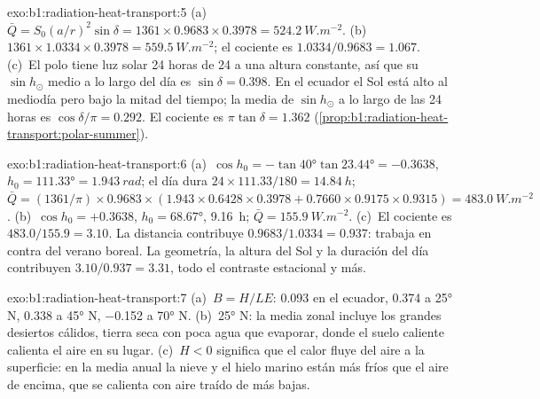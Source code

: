 \begin{solution}{exo:b1:radiation-heat-transport:5}
(a)~$\bar Q = S_0(a/r)^2\sin\delta = 1361 \times 0.9683 \times 0.3978 =
\qty{524.2}{W.m^{-2}}$. (b)~$1361 \times 1.0334 \times 0.3978 =
\qty{559.5}{W.m^{-2}}$; el cociente es $1.0334/0.9683 = 1.067$. (c)~El polo tiene
luz solar 24 horas de 24 a una altura constante, así que su $\sin h_\odot$ medio a lo largo del día es $\sin\delta = 0.398$. En el ecuador el Sol está alto al mediodía pero bajo la mitad del tiempo; la media de $\sin h_\odot$ a lo largo de las 24 horas es $\cos\delta/\pi =
0.292$. El cociente es $\pi\tan\delta = 1.362$
(\cref{prop:b1:radiation-heat-transport:polar-summer}).
\end{solution}

\begin{solution}{exo:b1:radiation-heat-transport:6}
(a)~$\cos h_0 = -\tan\ang{40}\tan\ang{23.44} = -0.3638$, $h_0 = \ang{111.33} =
\qty{1.943}{rad}$; el día dura $24 \times 111.33/180 = \qty{14.84}{h}$; $\bar Q =
(1361/\pi) \times 0.9683 \times (1.943 \times 0.6428 \times 0.3978 + 0.7660 \times
0.9175 \times 0.9315) = \qty{483.0}{W.m^{-2}}$. (b)~$\cos h_0 = +0.3638$, $h_0 =
\ang{68.67}$, \qty{9.16}{h}; $\bar Q = \qty{155.9}{W.m^{-2}}$. (c)~El cociente es
$483.0/155.9 = 3.10$. La distancia contribuye $0.9683/1.0334 = 0.937$: trabaja en contra del verano boreal. La geometría, la altura del Sol y la duración del día contribuyen $3.10/0.937 = 3.31$, todo el contraste estacional y más.
\end{solution}

\begin{solution}{exo:b1:radiation-heat-transport:7}
(a)~$B = H/LE$: \num{0.093} en el ecuador, \num{0.374} a \ang{25} N,
\num{0.338} a \ang{45} N, \num{-0.152} a \ang{70} N. (b)~\ang{25} N: la media zonal incluye los grandes desiertos cálidos, tierra seca con poca agua que evaporar, donde el suelo caliente calienta el aire en su lugar. (c)~$H < 0$ significa que el calor fluye del aire a la superficie: en la media anual la nieve y el hielo marino están más fríos que el aire de encima, que se calienta con aire traído de  más bajas.
\end{solution}

